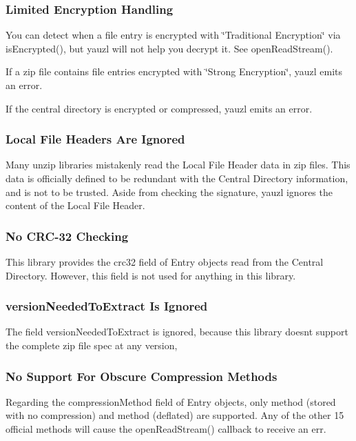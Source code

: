 \subsubsection*{Limited Encryption Handling}

You can detect when a file entry is encrypted with \char`\"{}\+Traditional Encryption\char`\"{} via {\ttfamily is\+Encrypted()}, but yauzl will not help you decrypt it. See {\ttfamily open\+Read\+Stream()}.

If a zip file contains file entries encrypted with \char`\"{}\+Strong Encryption\char`\"{}, yauzl emits an error.

If the central directory is encrypted or compressed, yauzl emits an error.

\subsubsection*{Local File Headers Are Ignored}

Many unzip libraries mistakenly read the Local File Header data in zip files. This data is officially defined to be redundant with the Central Directory information, and is not to be trusted. Aside from checking the signature, yauzl ignores the content of the Local File Header.

\subsubsection*{No C\+R\+C-\/32 Checking}

This library provides the {\ttfamily crc32} field of {\ttfamily Entry} objects read from the Central Directory. However, this field is not used for anything in this library.

\subsubsection*{version\+Needed\+To\+Extract Is Ignored}

The field {\ttfamily version\+Needed\+To\+Extract} is ignored, because this library doesn\textquotesingle{}t support the complete zip file spec at any version,

\subsubsection*{No Support For Obscure Compression Methods}

Regarding the {\ttfamily compression\+Method} field of {\ttfamily Entry} objects, only method {} (stored with no compression) and method {} (deflated) are supported. Any of the other 15 official methods will cause the {\ttfamily open\+Read\+Stream()} {\ttfamily callback} to receive an {\ttfamily err}.

